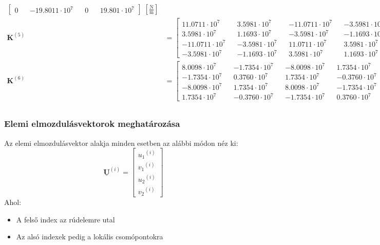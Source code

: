 \documentclass[12pt,a4paper]{article}
\def\mx#1{\mathbf{#1}}
\def\vec#1{\underline{\mathbf{#1}}}
\def\i{\left(i\right)}
\def\Nm{\; \left[\mathrm{\frac{N}{m}}\right]}
\def\futyi{\cdot 10^{7}}
\begin{document}
\begin{align}
\begin{bmatrix}
        0 &  & -19.8011 \futyi &  & 0 &  & 19.801 \futyi
    \end{bmatrix} \Nm                            \\
    \mx{K}^{\left(5\right)} & =
    \begin{bmatrix}
        11.0711 \futyi  &  & 3.5981 \futyi  &  & -11.0711 \futyi &  & -3.5981 \futyi \\
        3.5981 \futyi   &  & 1.1693 \futyi  &  & -3.5981 \futyi  &  & -1.1693 \futyi \\
        -11.0711 \futyi &  & -3.5981 \futyi &  & 11.0711 \futyi  &  & 3.5981 \futyi  \\
        -3.5981 \futyi  &  & -1.1693 \futyi &  & 3.5981 \futyi   &  & 1.1693 \futyi
    \end{bmatrix} \Nm \\
    \mx{K}^{\left(6\right)} & =
    \begin{bmatrix}
        8.0098 \futyi  &  & -1.7354 \futyi &  & -8.0098 \futyi &  & 1.7354 \futyi  \\
        -1.7354 \futyi &  & 0.3760 \futyi  &  & 1.7354 \futyi  &  & -0.3760 \futyi \\
        -8.0098 \futyi &  & 1.7354 \futyi  &  & 8.0098 \futyi  &  & -1.7354 \futyi \\
        1.7354 \futyi  &  & -0.3760 \futyi &  & -1.7354 \futyi &  & 0.3760 \futyi
    \end{bmatrix} \Nm   \\
\end{align}
\subsubsection{Elemi elmozdulásvektorok meghatározása}
Az elemi elmozdulásvektor alakja minden esetben az alábbi módon néz ki:
\begin{equation}
    \vec{\mathbf{U}}^{\i}=
    \begin{bmatrix}
        {u_1}^{\i} \\
        {v_1}^{\i} \\
        {u_2}^{\i} \\
        {v_2}^{\i}
    \end{bmatrix}
\end{equation}
Ahol:
\begin{itemize}
    \item A felső index az rúdelemre utal
    \item Az alsó indexek pedig a lokális csomópontokra
\end{itemize}
\end{document}

